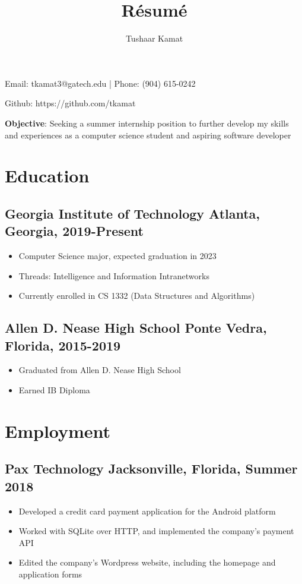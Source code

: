 \documentclass[12pt, noindent]{article}
\author{Tushaar Kamat}
\title{R\'esum\'e}
\makeatletter
\renewcommand{\maketitle}{
  \begin{center}
  \begin{Huge}
    \theauthor
  \end{Huge}

  Email: tkamat3@gatech.edu | Phone: (904) 615-0242

  Github: https://github.com/tkamat
  \end{center}
}
\makeatother
\begin{document}
\maketitle

\noindent \textbf{Objective}: Seeking a summer internship position to further
develop my skills and experiences as a computer science student and aspiring
software developer

\vspace{1em}
\section{Education} 
\subsection{Georgia Institute of Technology \hfill \normalsize
\normalfont Atlanta, Georgia, 2019-Present}
\begin{itemize}
\itemsep-.25em
\item Computer Science major, expected graduation in 2023
\item Threads: Intelligence and Information Intranetworks
\item Currently enrolled in CS 1332 (Data Structures and Algorithms)
\end{itemize}
\subsection{Allen D. Nease High School \hfill \normalsize \normalfont Ponte
  Vedra, Florida, 2015-2019}
\begin{itemize}
\itemsep-.25em 
\item Graduated from Allen D. Nease High School
\item Earned IB Diploma
\end{itemize}

\section{Employment}
\subsection{Pax Technology \hfill \normalsize \normalfont Jacksonville, Florida,
  Summer 2018}
\begin{itemize}
\itemsep-.25em
\item Developed a credit card payment application for the Android platform
\item Worked with SQLite over HTTP, and implemented the company's payment API
\item Edited the company's Wordpress website, including the homepage and
  application forms
\end{itemize}
\end{document}
